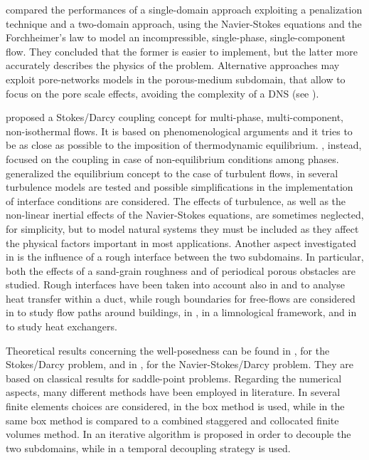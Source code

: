\textcite{intro:discacim} compared the performances of a single-domain approach exploiting a penalization technique and a 
two-domain approach, using the Navier-Stokes equations and the Forchheimer's 
law to model an incompressible, single-phase, single-component flow. They 
concluded that the former is easier to implement, but the latter more accurately describes the physics of the problem. Alternative approaches may exploit 
pore-networks models in the porous-medium subdomain, that allow to focus on the 
pore scale effects, avoiding the complexity of a DNS (see \cite{paper:kilian}).

\textcite{paper:mosthaf} proposed a Stokes/Darcy coupling concept for multi-phase, 
multi-component, non-isothermal flows. It is based on phenomenological arguments and it tries to be as close as possible to the 
imposition of thermodynamic equilibrium. \textcite{intro:davarzani}, instead, focused on the coupling in case of non-equilibrium conditions among phases.
\textcite{paper:fetzer} generalized the equilibrium concept to the case of 
turbulent flows, in \cite{tesi:fetzer} several turbulence models are tested and 
possible simplifications in the implementation of interface conditions are 
considered. The effects of turbulence, as well as the non-linear inertial 
effects of the Navier-Stokes equations, are sometimes neglected, for 
simplicity, 
but to model natural systems they must be included as they
affect the physical factors important in most applications.
Another aspect investigated in 
\cite{tesi:fetzer} is the influence of a rough interface between the two 
subdomains. In particular, both the effects of a sand-grain roughness and of 
periodical porous obstacles are studied.
Rough interfaces have been taken into account also in \cite{intro:kuzbek} and \cite{intro:kuz} to analyse heat transfer within a duct, while rough boundaries for free-flows are considered in \cite{lien:obstacles} to study flow paths around buildings, in \cite{intro:limnology}, in a limnological framework, and in \cite{intro:targui} to study heat exchangers.

Theoretical results concerning the well-posedness can be found in \cite{intro:disca}, for the Stokes/Darcy problem, and in \cite{intro:disca2009}, for the Navier-Stokes/Darcy problem. They are based on classical results for saddle-point problems. Regarding the numerical aspects, many different methods have been employed in literature. In \cite{intro:disca2009} several finite elements choices are considered, in \cite{tesi:mosthaf} the box method is used, while in \cite{tesi:fetzer} the same box method is compared to a combined staggered and collocated finite volumes method. In \cite{intro:disca} an iterative algorithm is proposed in order to decouple the two subdomains, while in \cite{intro:rybak} a temporal decoupling strategy is used.

